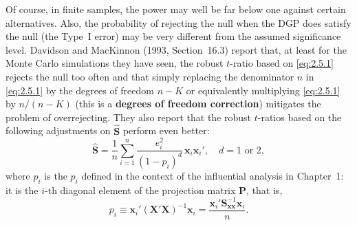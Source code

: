 Of course, in finite samples, the power may well be far below one against certain
alternatives.  Also, the probability of rejecting the null when the DGP does satisfy the
null (the Type~I error) may be very different from the assumed significance level.
Davidson and MacKinnon (1993, Section~16.3) report that, at least for the Monte Carlo
simulations they have seen, the robust $t$-ratio based on \eqref{eq:2.5.1} rejects the
null too often and that simply replacing the denominator $n$ in \eqref{eq:2.5.1} by the
degrees of freedom $n - K$ or equivalently multiplying \eqref{eq:2.5.1} by $n/(n - K)$
(this is a \textbf{degrees of freedom correction}) mitigates the problem of overrejecting.
They also report that the robust $t$-ratios based on the following adjustments on
$\widehat{\mathbf{S}}$ perform even better:
\begin{equation}
  \widehat{\mathbf{S}} = \frac{1}{n} \sum_{i=1}^{n}
    \frac{e_i^2}{(1 - p_i)^d}\, \mathbf{x}_i \mathbf{x}_i', \quad d = 1 \text{ or } 2,
  \label{eq:2.5.5}
\end{equation}
where $p_i$ is the $p_i$ defined in the context of the influential analysis in
Chapter~1: it is the $i$-th diagonal element of the projection matrix $\mathbf{P}$,
that is,
\[
  p_i \equiv \mathbf{x}_i'(\mathbf{X}'\mathbf{X})^{-1}\mathbf{x}_i
    = \frac{\mathbf{x}_i' \mathbf{S}_{\mathbf{xx}}^{-1} \mathbf{x}_i}{n}.
\]
